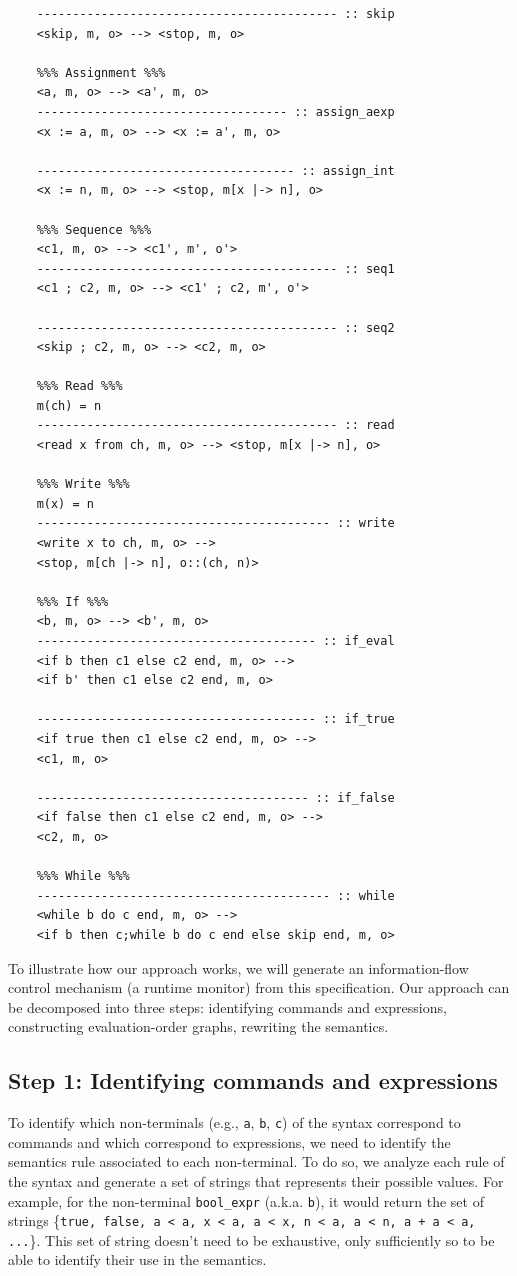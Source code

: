 \documentclass[conference]{IEEEtran}
\begin{document}
\begin{lstlisting}[label=listing:input-semantics-commands,captionpos=b,caption=Ott small-step semantics of commands]
	%%% Skip %%%
	------------------------------------------ :: skip
	<skip, m, o> --> <stop, m, o>

	%%% Assignment %%%
	<a, m, o> --> <a', m, o>
	----------------------------------- :: assign_aexp
	<x := a, m, o> --> <x := a', m, o>
	
	------------------------------------ :: assign_int
	<x := n, m, o> --> <stop, m[x |-> n], o>
	
	%%% Sequence %%%
	<c1, m, o> --> <c1', m', o'>
	------------------------------------------ :: seq1
	<c1 ; c2, m, o> --> <c1' ; c2, m', o'>
	
	------------------------------------------ :: seq2
	<skip ; c2, m, o> --> <c2, m, o>
	
	%%% Read %%%
	m(ch) = n
	------------------------------------------ :: read
	<read x from ch, m, o> --> <stop, m[x |-> n], o>
	
	%%% Write %%%
	m(x) = n
	----------------------------------------- :: write
	<write x to ch, m, o> --> 
	<stop, m[ch |-> n], o::(ch, n)>
	
	%%% If %%%
	<b, m, o> --> <b', m, o>
	--------------------------------------- :: if_eval
	<if b then c1 else c2 end, m, o> --> 
	<if b' then c1 else c2 end, m, o>
	
	--------------------------------------- :: if_true
	<if true then c1 else c2 end, m, o> --> 
	<c1, m, o>
	
	-------------------------------------- :: if_false
	<if false then c1 else c2 end, m, o> --> 
	<c2, m, o>
	
	%%% While %%%
	----------------------------------------- :: while
	<while b do c end, m, o> --> 
	<if b then c;while b do c end else skip end, m, o>
\end{lstlisting}

To illustrate how our approach works, we will generate an information-flow control mechanism (a runtime monitor) from this specification. Our approach can be decomposed into three steps: identifying commands and expressions, constructing evaluation-order graphs, rewriting the semantics.

\subsection{Step 1: Identifying commands and expressions}
To identify which non-terminals (e.g., \lstinline{a}, \lstinline{b}, \lstinline{c}) of the syntax correspond to commands and which correspond to expressions, we need to identify the semantics rule associated to each non-terminal. To do so, we analyze each rule of the syntax and generate a set of strings that represents their possible values. For example, for the non-terminal \lstinline{bool_expr} (a.k.a. \lstinline{b}), it would return the set of strings \{\lstinline{true, false, a < a, x < a, a < x, n < a, a < n, a + a < a, ...}\}. This set of string doesn't need to be exhaustive, only sufficiently so to be able to identify their use in the semantics. 
\end{document}
